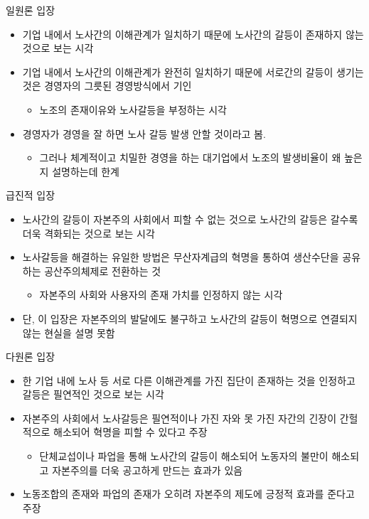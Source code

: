 \documentclass[aspectratio=169,xcolor=dvipsnames,handout]{beamer}
\begin{document}
\begin{frame}{일원론 입장}
    \begin{itemize}[<+->]
        \item 기업 내에서 노사간의 이해관계가 일치하기 때문에 노사간의 갈등이 존재하지 않는 것으로 보는 시각
        \item 기업 내에서 노사간의 이해관계가 완전히 일치하기 때문에 서로간의 갈등이 생기는 것은 경영자의 그릇된 경영방식에서 기인 
        \begin{itemize}[<+->]
            \item 노조의 존재이유와 노사갈등을 부정하는 시각
        \end{itemize}
        \item 경영자가 경영을 잘 하면 노사 갈등 발생 안할 것이라고 봄. 
        \begin{itemize}[<+->]
            \item 그러나 체계적이고 치밀한 경영을 하는 대기업에서 노조의 발생비율이 왜 높은지 설명하는데 한계
        \end{itemize}
    \end{itemize}
\end{frame}

\begin{frame}{급진적 입장}
    \begin{itemize}[<+->]
        \item 노사간의 갈등이 자본주의 사회에서 피할 수 없는 것으로 노사간의 갈등은 갈수록 더욱 격화되는 것으로 보는 시각
        \item 노사갈등을 해결하는 유일한 방법은 무산자계급의 혁명을 통하여 생산수단을 공유하는 공산주의체제로 전환하는 것 
        \begin{itemize}[<+->]
            \item 자본주의 사회와 사용자의 존재 가치를 인정하지 않는 시각
        \end{itemize}
        \item 단, 이 입장은 자본주의의 발달에도 불구하고 노사간의 갈등이 혁명으로 연결되지 않는 현실을 설명 못함
    \end{itemize}
\end{frame}

\begin{frame}{다원론 입장}
    \begin{itemize}[<+->]
        \item 한 기업 내에 노사 등 서로 다른 이해관계를 가진 집단이 존재하는 것을 인정하고 갈등은 필연적인 것으로 보는 시각
        \item 자본주의 사회에서 노사갈등은 필연적이나 가진 자와 못 가진 자간의 긴장이 간헐적으로 해소되어 혁명을 피할 수 있다고 주장 
        \begin{itemize}[<+->]
            \item 단체교섭이나 파업을 통해 노사간의 갈등이 해소되어 노동자의 불만이 해소되고 자본주의를 더욱 공고하게 만드는 효과가 있음
        \end{itemize}
        \item 노동조합의 존재와 파업의 존재가 오히려 자본주의 제도에 긍정적 효과를 준다고 주장
    \end{itemize}
\end{frame}
\end{document}
